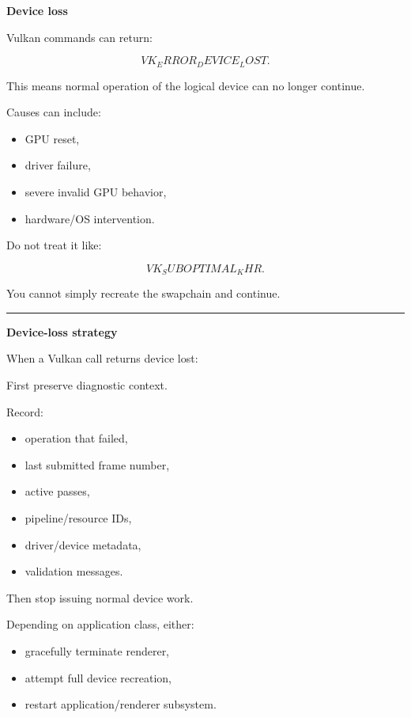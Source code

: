 \textbf{Device loss}

Vulkan commands can return:

\[
VK_ERROR_DEVICE_LOST.
\]

This means normal operation of the logical device can no longer continue.

Causes can include:

\begin{itemize}
\tightlist
\item
  GPU reset,
\item
  driver failure,
\item
  severe invalid GPU behavior,
\item
  hardware/OS intervention.
\end{itemize}

Do not treat it like:

\[
VK_SUBOPTIMAL_KHR.
\]

You cannot simply recreate the swapchain and continue.

\begin{center}\rule{0.5\linewidth}{0.5pt}\end{center}

\textbf{Device-loss strategy}

When a Vulkan call returns device lost:

First preserve diagnostic context.

Record:

\begin{itemize}
\tightlist
\item
  operation that failed,
\item
  last submitted frame number,
\item
  active passes,
\item
  pipeline/resource IDs,
\item
  driver/device metadata,
\item
  validation messages.
\end{itemize}

Then stop issuing normal device work.

Depending on application class, either:

\begin{itemize}
\tightlist
\item
  gracefully terminate renderer,
\item
  attempt full device recreation,
\item
  restart application/renderer subsystem.
\end{itemize}

